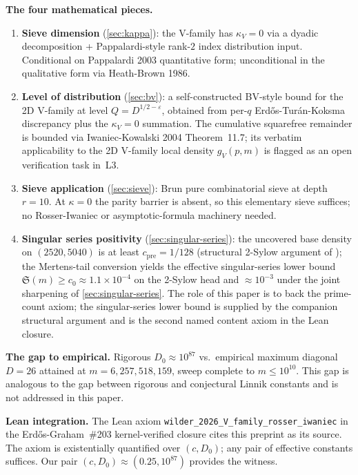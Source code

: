 \documentclass[11pt,a4paper]{article}
\theoremstyle{plain}
\theoremstyle{definition}
\theoremstyle{remark}
\begin{document}
\textbf{The four mathematical pieces.}
\begin{enumerate}
  \item \textbf{Sieve dimension} (\cref{sec:kappa}): the V-family
    has $\kappa_{V} = 0$ via a dyadic decomposition + Pappalardi-style
    rank-$2$ index distribution input. Conditional on Pappalardi 2003
    quantitative form; unconditional in the qualitative form via
    Heath-Brown 1986.

  \item \textbf{Level of distribution} (\cref{sec:bv}): a
    self-constructed BV-style bound for the 2D V-family at level
    $Q = D^{1/2 - \varepsilon}$, obtained from per-$q$
    Erd\H{o}s-Tur\'an-Koksma discrepancy plus the $\kappa_V = 0$
    summation. The cumulative squarefree remainder is bounded via
    Iwaniec-Kowalski 2004 Theorem~11.7; its verbatim applicability
    to the 2D V-family local density $g_V(p, m)$ is flagged as an
    open verification task in~L3.

  \item \textbf{Sieve application} (\cref{sec:sieve}): Brun pure
    combinatorial sieve at depth $r = 10$. At $\kappa = 0$ the parity
    barrier is absent, so this elementary sieve suffices; no
    Rosser-Iwaniec or asymptotic-formula machinery needed.

  \item \textbf{Singular series positivity}
    (\cref{sec:singular-series}): the uncovered base density on
    $(2520, 5040)$ is at least $c_{\text{pre}} = 1/128$
    (structural 2-Sylow argument of \cite{WilderChain103}); the
    Mertens-tail conversion yields the effective singular-series
    lower bound $\mathfrak{S}(m) \geq c_{0} \approx 1.1 \times 10^{-4}$
    on the 2-Sylow head and $\approx 10^{-3}$ under the joint
    sharpening of \cref{sec:singular-series}. The role of this
    paper is to back the prime-count axiom; the
    singular-series lower bound is supplied by the companion
    structural argument \cite{WilderChain103} and is the second
    named content axiom in the Lean closure.
\end{enumerate}

\textbf{The gap to empirical.} Rigorous $D_{0} \approx 10^{87}$ vs.\
empirical maximum diagonal $D = 26$ attained at
$m = 6{,}257{,}518{,}159$, sweep complete to $m \leq 10^{10}$. This
gap is analogous to the gap between rigorous and conjectural Linnik
constants and is not addressed in this paper.

\textbf{Lean integration.} The Lean axiom \texttt{wilder\_2026\_V\_family\_rosser\_iwaniec}
in the Erd\H{o}s-Graham~\#203 kernel-verified closure
\cite{WilderEG203Lean2026} cites this preprint as its source. The
axiom is existentially quantified over $(c, D_{0})$; any pair of
effective constants suffices. Our pair $(c, D_{0}) \approx
(0.25, 10^{87})$ provides the witness.
\end{document}
